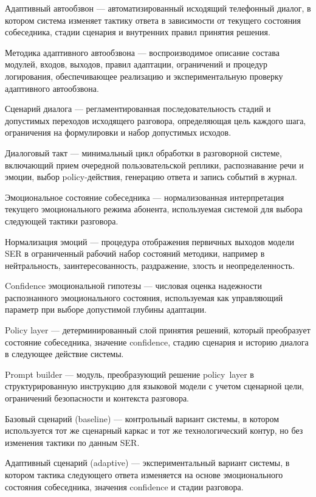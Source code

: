 \documentclass[a4paper,14pt]{extarticle}
\renewcommand{\texttt}[1]{\textnormal{#1}}
\begin{document}
Адаптивный автообзвон --- автоматизированный исходящий телефонный
диалог, в котором система изменяет тактику ответа в зависимости от
текущего состояния собеседника, стадии сценария и внутренних правил
принятия решения.

Методика адаптивного автообзвона --- воспроизводимое описание состава
модулей, входов, выходов, правил адаптации, ограничений и процедур
логирования, обеспечивающее реализацию и экспериментальную проверку
адаптивного автообзвона.

Сценарий диалога --- регламентированная последовательность стадий и
допустимых переходов исходящего разговора, определяющая цель каждого
шага, ограничения на формулировки и набор допустимых исходов.

Диалоговый такт --- минимальный цикл обработки в разговорной системе,
включающий прием очередной пользовательской реплики, распознавание речи
и эмоции, выбор policy-действия, генерацию ответа и запись событий в
журнал.

Эмоциональное состояние собеседника --- нормализованная интерпретация
текущего эмоционального режима абонента, используемая системой для
выбора следующей тактики разговора.

Нормализация эмоций --- процедура отображения первичных выходов модели
\texttt{SER} в ограниченный рабочий набор состояний методики, например в
нейтральность, заинтересованность, раздражение, злость и
неопределенность.

Confidence эмоциональной гипотезы --- числовая оценка надежности
распознанного эмоционального состояния, используемая как управляющий
параметр при выборе допустимой глубины адаптации.

Policy layer --- детерминированный слой принятия решений, который
преобразует состояние собеседника, значение \texttt{confidence}, стадию
сценария и историю диалога в следующее действие системы.

Prompt builder --- модуль, преобразующий решение \texttt{policy\ layer}
в структурированную инструкцию для языковой модели с учетом сценарной
цели, ограничений безопасности и контекста разговора.

Базовый сценарий (\texttt{baseline}) --- контрольный вариант системы, в
котором используется тот же сценарный каркас и тот же технологический
контур, но без изменения тактики по данным \texttt{SER}.

Адаптивный сценарий (\texttt{adaptive}) --- экспериментальный вариант
системы, в котором тактика следующего ответа изменяется на основе
эмоционального состояния собеседника, значения \texttt{confidence} и
стадии разговора.
\end{document}
